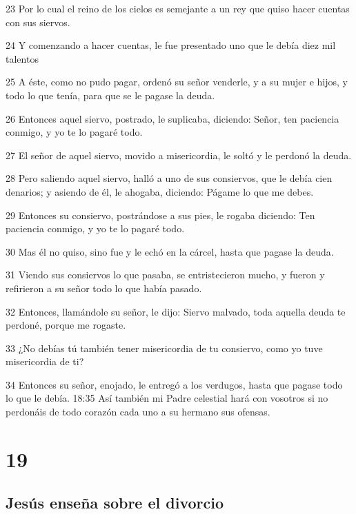 \par 23 Por lo cual el reino de los cielos es semejante a un rey que quiso hacer cuentas con sus siervos.
\par 24 Y comenzando a hacer cuentas, le fue presentado uno que le debía diez mil talentos
\par 25 A éste, como no pudo pagar, ordenó su señor venderle, y a su mujer e hijos, y todo lo que tenía, para que se le pagase la deuda.
\par 26 Entonces aquel siervo, postrado, le suplicaba, diciendo: Señor, ten paciencia conmigo, y yo te lo pagaré todo.
\par 27 El señor de aquel siervo, movido a misericordia, le soltó y le perdonó la deuda.
\par 28 Pero saliendo aquel siervo, halló a uno de sus consiervos, que le debía cien denarios; y asiendo de él, le ahogaba, diciendo: Págame lo que me debes.
\par 29 Entonces su consiervo, postrándose a sus pies, le rogaba diciendo: Ten paciencia conmigo, y yo te lo pagaré todo.
\par 30 Mas él no quiso, sino fue y le echó en la cárcel, hasta que pagase la deuda.
\par 31 Viendo sus consiervos lo que pasaba, se entristecieron mucho, y fueron y refirieron a su señor todo lo que había pasado.
\par 32 Entonces, llamándole su señor, le dijo: Siervo malvado, toda aquella deuda te perdoné, porque me rogaste.
\par 33 ¿No debías tú también tener misericordia de tu consiervo, como yo tuve misericordia de ti?
\par 34 Entonces su señor, enojado, le entregó a los verdugos, hasta que pagase todo lo que le debía. 18:35 Así también mi Padre celestial hará con vosotros si no perdonáis de todo corazón cada uno a su hermano sus ofensas.

\chapter{19}

\section*{Jesús enseña sobre el divorcio}

